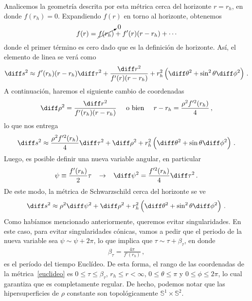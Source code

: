 \documentclass[../Main.tex]{subfiles}
\begin{document}
Analicemos la geometría descrita por esta métrica cerca del horizonte $r=r_h$, en donde $f(r_h)=0$. Expandiendo $f(r)$ en torno al horizonte, obtenemos
\begin{align}
    f(r)=\cancelto{0}{f(r_h)}+f'(r)(r-r_h)+\cdots
\end{align}
donde el primer término es cero dado que es la definición de horizonte. Así, el elemento de linea se verá como 
\begin{align}
    \diff s^2\approx f'(r_h)(r-r_h)\diff \tau^2+\frac{\diff r^2}{f'(r)(r-r_h)}+r_h^2\left(\diff \theta^2+\sin^2\theta\diff \phi^2\right)\, .
\end{align}
A continuación, haremos el siguiente cambio de coordenadas
\begin{align}
    \diff\rho^2=\frac{\diff r^2}{f'(r_h)(r-r_h)}\;\;\;\;\;\mbox{o bien}\;\;\;\;\; r-r_h=\frac{\rho^2 f'^2(r_h)}{4}\, ,
\end{align}
lo que nos entrega
\begin{align}
    \diff s^2\approx\frac{\rho^2 f'^2(r_h)}{4}\diff\tau^2+\diff\rho^2+r_h^2\left(\diff \theta^2+\sin\theta\diff \phi^2\right)\, .
\end{align}
Luego, es posible definir una nueva variable angular, en particular 
\begin{align}
    \psi\equiv\frac{f'(r_h)}{2}\tau \;\;\;\to\;\;\; \diff\psi^2=\frac{f'^2(r_h)}{4}\diff\tau^2 \, .
\end{align}
De este modo, la métrica de Schwarzschild cerca del horizonte se ve 
\begin{align}
    \diff s^2\approx\rho^2\diff\psi^2+\diff\rho^2+r_h^2\left(\diff \theta^2+\sin^2\theta\diff \phi^2\right)\, . \label{euclideo}
\end{align}
Como habíamos mencionado anteriormente, queremos evitar singularidades. En este caso, para evitar singularidades cónicas, vamos a pedir que el periodo de la nueva variable sea $\psi\sim\psi +2\pi$, lo que implica que $\tau\sim\tau+\beta_{\tau}$, en donde 
\begin{align}
    \beta_{\tau}=\frac{4\pi}{f'(r_h)}\, , \label{btau}
\end{align}
es el período del tiempo Euclídeo. De esta forma, el rango de las coordenadas de la métrica~\eqref{euclideo} es $0\leqslant\tau\leqslant\beta_{\tau}$, $r_{h}\leqslant r<\infty$, $0\leqslant\theta\leqslant\pi$ y $0\leqslant\phi\leqslant 2\pi$, lo cual garantiza que es completamente regular. De hecho, podemos notar que las hipersuperficies de $\rho$ constante son topológicamente $\mathbb{S}^1\times\mathbb{S}^2$. 
\end{document}
